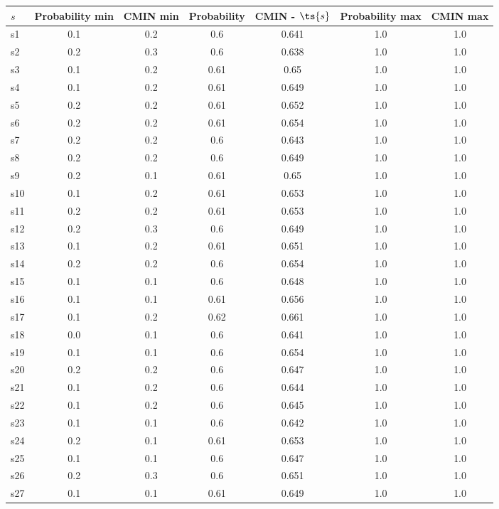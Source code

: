 \documentclass{article}
\begin{document}
\noindent\begin{tabular}{|l|c|c|c|c|c|c|}
\hline
$s$& Probability min & CMIN min & Probability & CMIN - $\ts{s}$ & Probability max & CMIN max\\
\hline
s1 &0.1 & 0.2 & 0.6 & 0.641 & 1.0 & 1.0\\
\hline
s2 &0.2 & 0.3 & 0.6 & 0.638 & 1.0 & 1.0\\
\hline
s3 &0.1 & 0.2 & 0.61 & 0.65 & 1.0 & 1.0\\
\hline
s4 &0.1 & 0.2 & 0.61 & 0.649 & 1.0 & 1.0\\
\hline
s5 &0.2 & 0.2 & 0.61 & 0.652 & 1.0 & 1.0\\
\hline
s6 &0.2 & 0.2 & 0.61 & 0.654 & 1.0 & 1.0\\
\hline
s7 &0.2 & 0.2 & 0.6 & 0.643 & 1.0 & 1.0\\
\hline
s8 &0.2 & 0.2 & 0.6 & 0.649 & 1.0 & 1.0\\
\hline
s9 &0.2 & 0.1 & 0.61 & 0.65 & 1.0 & 1.0\\
\hline
s10 &0.1 & 0.2 & 0.61 & 0.653 & 1.0 & 1.0\\
\hline
s11 &0.2 & 0.2 & 0.61 & 0.653 & 1.0 & 1.0\\
\hline
s12 &0.2 & 0.3 & 0.6 & 0.649 & 1.0 & 1.0\\
\hline
s13 &0.1 & 0.2 & 0.61 & 0.651 & 1.0 & 1.0\\
\hline
s14 &0.2 & 0.2 & 0.6 & 0.654 & 1.0 & 1.0\\
\hline
s15 &0.1 & 0.1 & 0.6 & 0.648 & 1.0 & 1.0\\
\hline
s16 &0.1 & 0.1 & 0.61 & 0.656 & 1.0 & 1.0\\
\hline
s17 &0.1 & 0.2 & 0.62 & 0.661 & 1.0 & 1.0\\
\hline
s18 &0.0 & 0.1 & 0.6 & 0.641 & 1.0 & 1.0\\
\hline
s19 &0.1 & 0.1 & 0.6 & 0.654 & 1.0 & 1.0\\
\hline
s20 &0.2 & 0.2 & 0.6 & 0.647 & 1.0 & 1.0\\
\hline
s21 &0.1 & 0.2 & 0.6 & 0.644 & 1.0 & 1.0\\
\hline
s22 &0.1 & 0.2 & 0.6 & 0.645 & 1.0 & 1.0\\
\hline
s23 &0.1 & 0.1 & 0.6 & 0.642 & 1.0 & 1.0\\
\hline
s24 &0.2 & 0.1 & 0.61 & 0.653 & 1.0 & 1.0\\
\hline
s25 &0.1 & 0.1 & 0.6 & 0.647 & 1.0 & 1.0\\
\hline
s26 &0.2 & 0.3 & 0.6 & 0.651 & 1.0 & 1.0\\
\hline
s27 &0.1 & 0.1 & 0.61 & 0.649 & 1.0 & 1.0\\

\end{tabular}
\end{document}
